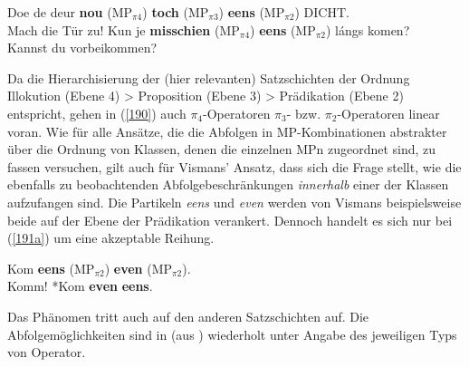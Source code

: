 \begin{exe}
	\ex\label{190} 
	\begin{xlist}	
			\ex\label{190a} 
				Doe de deur \textbf{nou} ($\textrm{MP}_{\pi4}$) \textbf{toch} ($\textrm{MP}_{\pi3}$) \textbf{eens} ($\textrm{MP}_{\pi2}$) DICHT.\\
				Mach die Tür zu!
			\ex\label{190b} 
				Kun je \textbf{misschien} ($\textrm{MP}_{\pi4}$) \textbf{eens} ($\textrm{MP}_{\pi2}$) lángs komen?\\
				Kannst du vorbeikommen?				
	\hfill\hbox{\citet[163/201]{Vismans1994}}
	\end{xlist}
\end{exe}
Da die Hierarchisierung der (hier relevanten) Satzschichten der Ordnung  Illokution (Ebene 4) > Proposition  (Ebene 3) > Prädikation  (Ebene 2) entspricht, gehen in (\ref{190}) auch $\pi_{4}$-Operatoren $\pi_{3}$- bzw. $\pi_{2}$-Operatoren linear voran. Wie für alle Ansätze, die die Abfolgen in MP-Kom\-bi\-na\-ti\-on\-en abstrakter über die Ordnung von Klassen, denen die einzelnen MPn zugeordnet sind, zu fassen versuchen, gilt auch für Vismans' Ansatz, dass sich die Frage stellt, wie die ebenfalls zu beobachtenden Abfolgebeschränkungen \emph{innerhalb} einer der Klassen aufzufangen sind. Die Partikeln \textit{eens} und \textit{even} werden von Vismans beispielsweise beide auf der Ebene der Prädikation  verankert. Dennoch handelt es sich nur bei (\ref{191a}) um eine akzeptable Reihung.

\begin{exe}
	\ex\label{191} 
	\begin{xlist}	
			\ex\label{191a} 
				Kom \textbf{eens} ($\textrm{MP}_{\pi2}$) \textbf{even} ($\textrm{MP}_{\pi2}$).\\
				Komm!
			\ex\label{191b} 
				*Kom \textbf{even} \textbf{eens}.			
	\hfill\hbox{\citet[163]{Vismans1994}}
	\end{xlist}
\end{exe}
Das Phänomen tritt auch auf den anderen Satzschichten auf. Die Abfolgemöglich\-keiten sind in  (aus \citealt[5]{Vismans1994}) wiederholt unter Angabe des jeweiligen Typs von Operator. 


